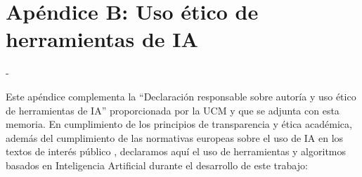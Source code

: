 \chapter{Apéndice B: Uso ético de herramientas de IA}
\label{Appendix:2}

-

Este apéndice complementa la ``Declaración responsable sobre autoría y uso ético de herramientas de IA'' proporcionada por la UCM y que se adjunta con esta memoria. En cumplimiento de los principios de transparencia y ética académica, además del cumplimiento de las normativas europeas sobre el uso de IA en los textos de interés público \citep{RIA2024Art50}, declaramos aquí el uso de herramientas y algoritmos basados en Inteligencia Artificial durante el desarrollo de este trabajo:

